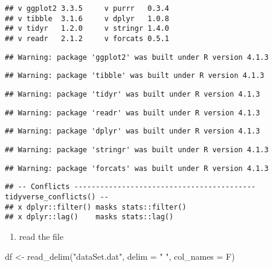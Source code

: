 \documentclass[
]{article}
\newenvironment{Shaded}{\begin{snugshade}}{\end{snugshade}}
\newcommand{\AttributeTok}[1]{\textcolor[rgb]{0.77,0.63,0.00}{#1}}
\newcommand{\FunctionTok}[1]{\textcolor[rgb]{0.00,0.00,0.00}{#1}}
\newcommand{\NormalTok}[1]{#1}
\newcommand{\OtherTok}[1]{\textcolor[rgb]{0.56,0.35,0.01}{#1}}
\newcommand{\StringTok}[1]{\textcolor[rgb]{0.31,0.60,0.02}{#1}}
\providecommand{\tightlist}{%
  \setlength{\itemsep}{0pt}\setlength{\parskip}{0pt}}
\begin{document}
\begin{verbatim}
## v ggplot2 3.3.5     v purrr   0.3.4
## v tibble  3.1.6     v dplyr   1.0.8
## v tidyr   1.2.0     v stringr 1.4.0
## v readr   2.1.2     v forcats 0.5.1
\end{verbatim}

\begin{verbatim}
## Warning: package 'ggplot2' was built under R version 4.1.3
\end{verbatim}

\begin{verbatim}
## Warning: package 'tibble' was built under R version 4.1.3
\end{verbatim}

\begin{verbatim}
## Warning: package 'tidyr' was built under R version 4.1.3
\end{verbatim}

\begin{verbatim}
## Warning: package 'readr' was built under R version 4.1.3
\end{verbatim}

\begin{verbatim}
## Warning: package 'dplyr' was built under R version 4.1.3
\end{verbatim}

\begin{verbatim}
## Warning: package 'stringr' was built under R version 4.1.3
\end{verbatim}

\begin{verbatim}
## Warning: package 'forcats' was built under R version 4.1.3
\end{verbatim}

\begin{verbatim}
## -- Conflicts ------------------------------------------ tidyverse_conflicts() --
## x dplyr::filter() masks stats::filter()
## x dplyr::lag()    masks stats::lag()
\end{verbatim}

\begin{enumerate}
\def\labelenumi{\roman{enumi})}
\tightlist
\item
  read the file
\end{enumerate}

\begin{Shaded}
\begin{Highlighting}[]
\NormalTok{df }\OtherTok{\textless{}{-}} \FunctionTok{read\_delim}\NormalTok{(}\StringTok{"dataSet.dat"}\NormalTok{, }\AttributeTok{delim =} \StringTok{" "}\NormalTok{, }\AttributeTok{col\_names =}\NormalTok{ F)}
\end{Highlighting}
\end{Shaded}
\end{document}

